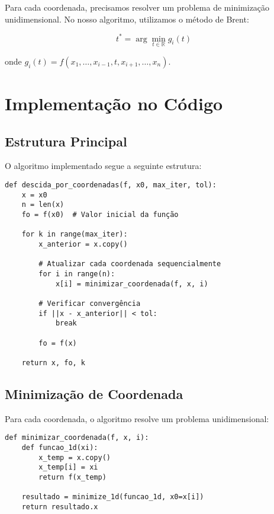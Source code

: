 \documentclass[12pt]{article}
\begin{document}
Para cada coordenada, precisamos resolver um problema de minimização unidimensional. No nosso algoritmo, utilizamos o método de Brent:

\begin{equation}
t^* = \arg\min_{t \in \mathbb{R}} g_i(t)
\end{equation}

onde $g_i(t) = f(x_1, \ldots, x_{i-1}, t, x_{i+1}, \ldots, x_n)$.

\section{Implementação no Código}

\subsection{Estrutura Principal}

O algoritmo implementado segue a seguinte estrutura:

\begin{verbatim}
def descida_por_coordenadas(f, x0, max_iter, tol):
    x = x0
    n = len(x)
    fo = f(x0)  # Valor inicial da função
    
    for k in range(max_iter):
        x_anterior = x.copy()
        
        # Atualizar cada coordenada sequencialmente
        for i in range(n):
            x[i] = minimizar_coordenada(f, x, i)
        
        # Verificar convergência
        if ||x - x_anterior|| < tol:
            break
            
        fo = f(x)
    
    return x, fo, k
\end{verbatim}

\subsection{Minimização de Coordenada}

Para cada coordenada, o algoritmo resolve um problema unidimensional:

\begin{verbatim}
def minimizar_coordenada(f, x, i):
    def funcao_1d(xi):
        x_temp = x.copy()
        x_temp[i] = xi
        return f(x_temp)
    
    resultado = minimize_1d(funcao_1d, x0=x[i])
    return resultado.x
\end{verbatim}
\end{document}
